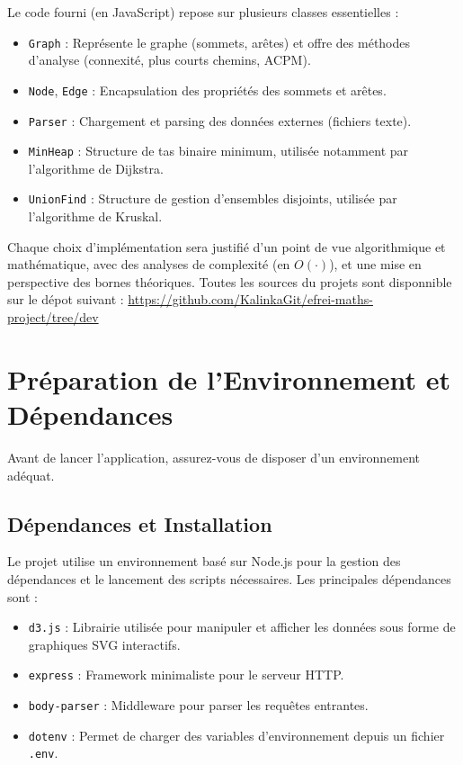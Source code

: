 \documentclass[a4paper,12pt]{article}
\begin{document}
Le code fourni (en JavaScript) repose sur plusieurs classes essentielles :
\begin{itemize}
    \item \texttt{Graph} : Représente le graphe (sommets, arêtes) et offre des méthodes d’analyse (connexité, plus courts chemins, ACPM).
    \item \texttt{Node}, \texttt{Edge} : Encapsulation des propriétés des sommets et arêtes.
    \item \texttt{Parser} : Chargement et parsing des données externes (fichiers texte).
    \item \texttt{MinHeap} : Structure de tas binaire minimum, utilisée notamment par l’algorithme de Dijkstra.
    \item \texttt{UnionFind} : Structure de gestion d'ensembles disjoints, utilisée par l’algorithme de Kruskal.
\end{itemize}

Chaque choix d’implémentation sera justifié d’un point de vue algorithmique et mathématique, avec des analyses de complexité (en $O(\cdot)$), et une mise en perspective des bornes théoriques. Toutes les sources du projets sont disponnible sur le dépot suivant : \url{https://github.com/KalinkaGit/efrei-maths-project/tree/dev}


\section{Préparation de l'Environnement et Dépendances}

Avant de lancer l’application, assurez-vous de disposer d’un environnement adéquat.

\subsection{Dépendances et Installation}

Le projet utilise un environnement basé sur Node.js pour la gestion des dépendances et le lancement des scripts nécessaires. Les principales dépendances sont :

\begin{itemize}
    \item \texttt{d3.js} : Librairie utilisée pour manipuler et afficher les données sous forme de graphiques SVG interactifs.
    \item \texttt{express} : Framework minimaliste pour le serveur HTTP.
    \item \texttt{body-parser} : Middleware pour parser les requêtes entrantes.
    \item \texttt{dotenv} : Permet de charger des variables d’environnement depuis un fichier \texttt{.env}.
\end{itemize}
\end{document}
